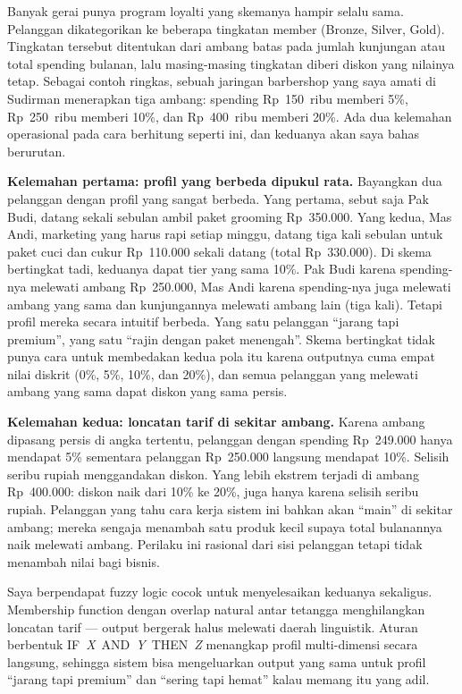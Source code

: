 \documentclass[conference]{IEEEtran}
\begin{document}
Banyak gerai punya program loyalti yang skemanya hampir selalu sama.
Pelanggan dikategorikan ke beberapa tingkatan member (Bronze, Silver, Gold).
Tingkatan tersebut ditentukan dari ambang batas pada jumlah kunjungan
atau total spending bulanan, lalu masing-masing tingkatan diberi diskon
yang nilainya tetap. Sebagai contoh ringkas, sebuah jaringan barbershop
yang saya amati di Sudirman menerapkan tiga ambang: spending
Rp~150~ribu memberi 5\%, Rp~250~ribu memberi 10\%, dan Rp~400~ribu
memberi 20\%. Ada dua kelemahan operasional pada cara berhitung
seperti ini, dan keduanya akan saya bahas berurutan.

\textbf{Kelemahan pertama: profil yang berbeda dipukul rata.} Bayangkan
dua pelanggan dengan profil yang sangat berbeda. Yang pertama, sebut
saja Pak Budi, datang sekali sebulan ambil paket grooming Rp~350.000.
Yang kedua, Mas Andi, marketing yang harus rapi setiap minggu, datang
tiga kali sebulan untuk paket cuci dan cukur Rp~110.000 sekali datang
(total Rp~330.000). Di skema bertingkat tadi, keduanya dapat tier yang
sama 10\%. Pak Budi karena spending-nya melewati ambang Rp~250.000,
Mas Andi karena spending-nya juga melewati ambang yang sama dan
kunjungannya melewati ambang lain (tiga kali). Tetapi profil mereka
secara intuitif berbeda. Yang satu pelanggan ``jarang tapi premium'',
yang satu ``rajin dengan paket menengah''. Skema bertingkat tidak punya
cara untuk membedakan kedua pola itu karena outputnya cuma empat nilai
diskrit (0\%, 5\%, 10\%, dan 20\%), dan semua pelanggan yang melewati
ambang yang sama dapat diskon yang sama persis.

\textbf{Kelemahan kedua: loncatan tarif di sekitar ambang.} Karena
ambang dipasang persis di angka tertentu, pelanggan dengan spending
Rp~249.000 hanya mendapat 5\% sementara pelanggan Rp~250.000 langsung
mendapat 10\%. Selisih seribu rupiah menggandakan diskon. Yang lebih
ekstrem terjadi di ambang Rp~400.000: diskon naik dari 10\% ke 20\%, juga
hanya karena selisih seribu rupiah. Pelanggan yang tahu cara kerja
sistem ini bahkan akan ``main'' di sekitar ambang; mereka sengaja
menambah satu produk kecil supaya total bulanannya naik melewati
ambang. Perilaku ini rasional dari sisi pelanggan tetapi tidak menambah
nilai bagi bisnis.

Saya berpendapat fuzzy logic cocok untuk menyelesaikan keduanya
sekaligus. Membership function dengan overlap natural antar tetangga
menghilangkan loncatan tarif --- output bergerak halus melewati daerah
linguistik. Aturan berbentuk IF~\emph{X}~AND~\emph{Y}~THEN~\emph{Z}
menangkap profil multi-dimensi secara langsung, sehingga sistem bisa
mengeluarkan output yang sama untuk profil ``jarang tapi premium''
dan ``sering tapi hemat'' kalau memang itu yang adil.
\end{document}

